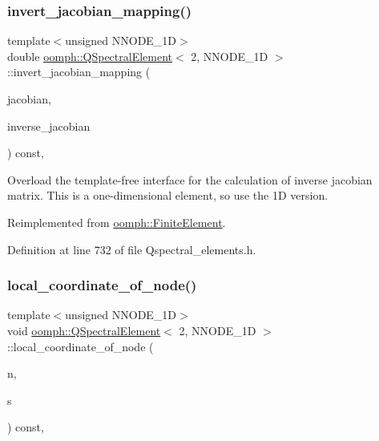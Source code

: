 \subsubsection{\texorpdfstring{invert\+\_\+jacobian\+\_\+mapping()}{invert\_jacobian\_mapping()}}
{\footnotesize\ttfamily template$<$unsigned N\+N\+O\+D\+E\+\_\+1D$>$ \\
double \hyperlink{classoomph_1_1QSpectralElement}{oomph\+::\+Q\+Spectral\+Element}$<$ 2, N\+N\+O\+D\+E\+\_\+1D $>$\+::invert\+\_\+jacobian\+\_\+mapping (\begin{DoxyParamCaption}\item[{const \hyperlink{classoomph_1_1DenseMatrix}{Dense\+Matrix}$<$ double $>$ \&}]{jacobian,  }\item[{\hyperlink{classoomph_1_1DenseMatrix}{Dense\+Matrix}$<$ double $>$ \&}]{inverse\+\_\+jacobian }\end{DoxyParamCaption}) const\hspace{0.3cm}{\ttfamily [inline]}, {\ttfamily [virtual]}}



Overload the template-\/free interface for the calculation of inverse jacobian matrix. This is a one-\/dimensional element, so use the 1D version. 



Reimplemented from \hyperlink{classoomph_1_1FiniteElement_a42c86a7628fee00d3a9d35b935b29e48}{oomph\+::\+Finite\+Element}.



Definition at line 732 of file Qspectral\+\_\+elements.\+h.

\mbox{\label{classoomph_1_1QSpectralElement_3_012_00_01NNODE__1D_01_4_a19b8164d8847a8b6a09cce1aeefe6225}} 
\subsubsection{\texorpdfstring{local\+\_\+coordinate\+\_\+of\+\_\+node()}{local\_coordinate\_of\_node()}}
{\footnotesize\ttfamily template$<$unsigned N\+N\+O\+D\+E\+\_\+1D$>$ \\
void \hyperlink{classoomph_1_1QSpectralElement}{oomph\+::\+Q\+Spectral\+Element}$<$ 2, N\+N\+O\+D\+E\+\_\+1D $>$\+::local\+\_\+coordinate\+\_\+of\+\_\+node (\begin{DoxyParamCaption}\item[{const unsigned \&}]{n,  }\item[{\hyperlink{classoomph_1_1Vector}{Vector}$<$ double $>$ \&}]{s }\end{DoxyParamCaption}) const\hspace{0.3cm}{\ttfamily [inline]}, {\ttfamily [virtual]}}



